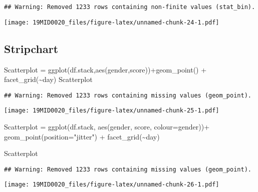 \documentclass[
]{article}
\newenvironment{Shaded}{\begin{snugshade}}{\end{snugshade}}
\newcommand{\AttributeTok}[1]{\textcolor[rgb]{0.77,0.63,0.00}{#1}}
\newcommand{\FunctionTok}[1]{\textcolor[rgb]{0.00,0.00,0.00}{#1}}
\newcommand{\NormalTok}[1]{#1}
\newcommand{\OtherTok}[1]{\textcolor[rgb]{0.56,0.35,0.01}{#1}}
\newcommand{\SpecialCharTok}[1]{\textcolor[rgb]{0.00,0.00,0.00}{#1}}
\newcommand{\StringTok}[1]{\textcolor[rgb]{0.31,0.60,0.02}{#1}}
\begin{document}
\begin{verbatim}
## Warning: Removed 1233 rows containing non-finite values (stat_bin).
\end{verbatim}

\texttt{[image: 19MID0020\_files/figure-latex/unnamed-chunk-24-1.pdf]}

\hypertarget{stripchart}{%
\subsection{Stripchart}\label{stripchart}}

\begin{Shaded}
\begin{Highlighting}[]
\NormalTok{Scatterplot }\OtherTok{=} \FunctionTok{ggplot}\NormalTok{(df.stack,}\FunctionTok{aes}\NormalTok{(gender,score))}\SpecialCharTok{+}\FunctionTok{geom\_point}\NormalTok{() }\SpecialCharTok{+} \FunctionTok{facet\_grid}\NormalTok{(}\SpecialCharTok{\textasciitilde{}}\NormalTok{day)}
\NormalTok{Scatterplot}
\end{Highlighting}
\end{Shaded}

\begin{verbatim}
## Warning: Removed 1233 rows containing missing values (geom_point).
\end{verbatim}

\texttt{[image: 19MID0020\_files/figure-latex/unnamed-chunk-25-1.pdf]}

\begin{Shaded}
\begin{Highlighting}[]
\NormalTok{Scatterplot }\OtherTok{=} \FunctionTok{ggplot}\NormalTok{(df.stack, }\FunctionTok{aes}\NormalTok{(gender, score, }\AttributeTok{colour=}\NormalTok{gender))}\SpecialCharTok{+}
              \FunctionTok{geom\_point}\NormalTok{(}\AttributeTok{position=}\StringTok{"jitter"}\NormalTok{) }\SpecialCharTok{+} 
              \FunctionTok{facet\_grid}\NormalTok{(}\SpecialCharTok{\textasciitilde{}}\NormalTok{day)}

\NormalTok{Scatterplot}
\end{Highlighting}
\end{Shaded}

\begin{verbatim}
## Warning: Removed 1233 rows containing missing values (geom_point).
\end{verbatim}

\texttt{[image: 19MID0020\_files/figure-latex/unnamed-chunk-26-1.pdf]}
\end{document}

